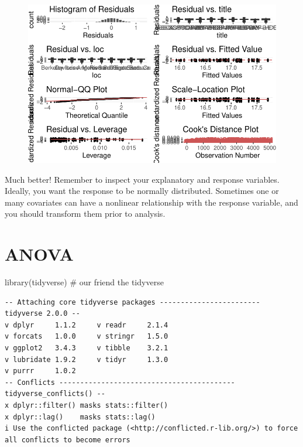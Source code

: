 \documentclass[
  letterpaper,
  DIV=11,
  numbers=noendperiod]{scrreprt}
\newenvironment{Shaded}{\begin{snugshade}}{\end{snugshade}}
\newcommand{\CommentTok}[1]{\textcolor[rgb]{0.37,0.37,0.37}{#1}}
\newcommand{\FunctionTok}[1]{\textcolor[rgb]{0.28,0.35,0.67}{#1}}
\newcommand{\NormalTok}[1]{\textcolor[rgb]{0.00,0.23,0.31}{#1}}
\begin{document}
\begin{figure}[H]

{\centering \includegraphics{./08-linearreg_files/figure-pdf/unnamed-chunk-35-1.pdf}

}

\end{figure}

Much better! Remember to inspect your explanatory and response
variables. Ideally, you want the response to be normally distributed.
Sometimes one or many covariates can have a nonlinear relationship with
the response variable, and you should transform them prior to analysis.


\hypertarget{anova}{%
\chapter{ANOVA}\label{anova}}

\begin{Shaded}
\begin{Highlighting}[]
\FunctionTok{library}\NormalTok{(tidyverse) }\CommentTok{\# our friend the tidyverse}
\end{Highlighting}
\end{Shaded}

\begin{verbatim}
-- Attaching core tidyverse packages ------------------------ tidyverse 2.0.0 --
v dplyr     1.1.2     v readr     2.1.4
v forcats   1.0.0     v stringr   1.5.0
v ggplot2   3.4.3     v tibble    3.2.1
v lubridate 1.9.2     v tidyr     1.3.0
v purrr     1.0.2     
-- Conflicts ------------------------------------------ tidyverse_conflicts() --
x dplyr::filter() masks stats::filter()
x dplyr::lag()    masks stats::lag()
i Use the conflicted package (<http://conflicted.r-lib.org/>) to force all conflicts to become errors
\end{verbatim}
\end{document}
